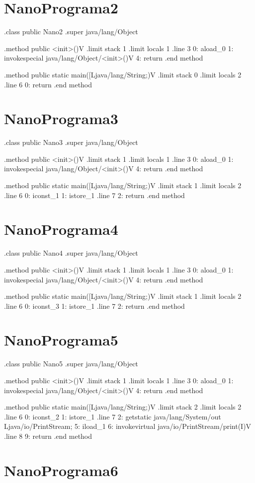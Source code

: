 \documentclass[12pt,a4paper,twoside]{report}
\begin{document}
\section{NanoPrograma2}
\begin{terminal}
.class public Nano2
.super java/lang/Object

.method public <init>()V
  .limit stack 1
  .limit locals 1
  .line 3
  0: aload_0
  1: invokespecial java/lang/Object/<init>()V
  4: return
.end method

.method public static main([Ljava/lang/String;)V
  .limit stack 0
  .limit locals 2
  .line 6
  0: return
.end method

\end{terminal}\section{NanoPrograma3}
\begin{terminal}
.class public Nano3
.super java/lang/Object

.method public <init>()V
  .limit stack 1
  .limit locals 1
  .line 3
  0: aload_0
  1: invokespecial java/lang/Object/<init>()V
  4: return
.end method

.method public static main([Ljava/lang/String;)V
  .limit stack 1
  .limit locals 2
  .line 6
  0: iconst_1
  1: istore_1
  .line 7
  2: return
.end method
\end{terminal}\section{NanoPrograma4}
\begin{terminal}
.class public Nano4
.super java/lang/Object

.method public <init>()V
  .limit stack 1
  .limit locals 1
  .line 3
  0: aload_0
  1: invokespecial java/lang/Object/<init>()V
  4: return
.end method

.method public static main([Ljava/lang/String;)V
  .limit stack 1
  .limit locals 2
  .line 6
  0: iconst_3
  1: istore_1
  .line 7
  2: return
.end method
\end{terminal}\section{NanoPrograma5}
\begin{terminal}
.class public Nano5
.super java/lang/Object

.method public <init>()V
  .limit stack 1
  .limit locals 1
  .line 3
  0: aload_0
  1: invokespecial java/lang/Object/<init>()V
  4: return
.end method

.method public static main([Ljava/lang/String;)V
  .limit stack 2
  .limit locals 2
  .line 6
  0: iconst_2
  1: istore_1
  .line 7
  2: getstatic java/lang/System/out Ljava/io/PrintStream;
  5: iload_1
  6: invokevirtual java/io/PrintStream/print(I)V
  .line 8
  9: return
.end method

\end{terminal}\section{NanoPrograma6}
\end{document}

